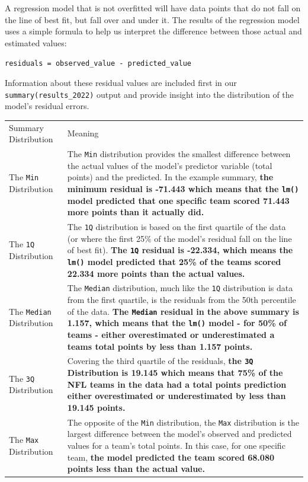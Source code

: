 \documentclass[
  letterpaper,
]{krantz}
\begin{document}
\begin{tcolorbox}
A regression model that is not overfitted will have data points that do
not fall on the line of best fit, but fall over and under it. The
results of the regression model uses a simple formula to help us
interpret the difference between those actual and estimated values:

\texttt{residuals\ =\ observed\_value\ -\ predicted\_value}

Information about these residual values are included first in our
\texttt{summary(results\_2022)} output and provide insight into the
distribution of the model's residual errors.

\begin{longtable}[]{@{}
  >{\centering\arraybackslash}p{}
  >{\centering\arraybackslash}p{}@{}}
\toprule\noalign{}
\endhead
\bottomrule\noalign{}
\endlastfoot
Summary Distribution & Meaning \\
The \texttt{Min} Distribution & The \texttt{Min} distribution provides
the smallest difference between the actual values of the model's
predictor variable (total points) and the predicted. In the example
summary, \textbf{the minimum residual is -71.443 which means that the
\texttt{lm()} model predicted that one specific team scored 71.443 more
points than it actually did.} \\
The \texttt{1Q} Distribution & The \texttt{1Q} distribution is based on
the first quartile of the data (or where the first 25\% of the model's
residual fall on the line of best fit). \textbf{The \texttt{1Q} residual
is -22.334, which means the \texttt{lm()} model predicted that 25\% of
the teams scored 22.334 more points than the actual values.} \\
The \texttt{Median} Distribution & The \texttt{Median} distribution,
much like the \texttt{1Q} distribution is data from the first quartile,
is the residuals from the 50th percentile of the data. \textbf{The
\texttt{Median} residual in the above summary is 1.157, which means that
the \texttt{lm()} model - for 50\% of teams - either overestimated or
underestimated a teams total points by less than 1.157 points.} \\
The \texttt{3Q} Distribution & Covering the third quartile of the
residuals, \textbf{the \texttt{3Q} Distribution is 19.145 which means
that 75\% of the NFL teams in the data had a total points prediction
either overestimated or underestimated by less than 19.145 points.} \\
The \texttt{Max} Distribution & The opposite of the \texttt{Min}
distribution, the \texttt{Max} distribution is the largest difference
between the model's observed and predicted values for a team's total
points. In this case, for one specific team, \textbf{the model predicted
the team scored 68.080 points less than the actual value.} \\
\end{longtable}


\end{tcolorbox}
\end{document}
